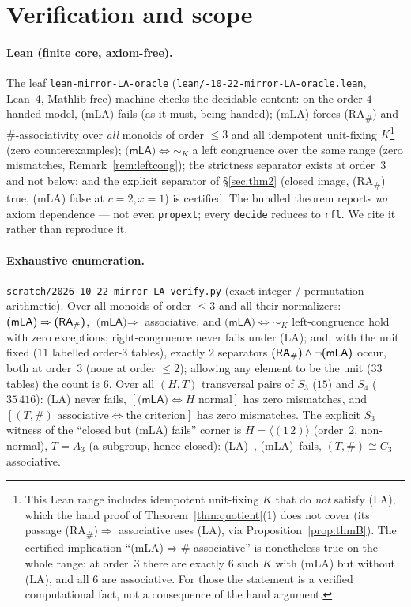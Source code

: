 \documentclass[11pt]{amsart}
\theoremstyle{plain}
\theoremstyle{definition}
\theoremstyle{remark}
\newcommand{\sh}{\mathbin{\#}}
\newcommand{\LA}{\textsf{(LA)}}
\newcommand{\mLA}{\textsf{(mLA)}}
\newcommand{\RA}{\textsf{(RA}\textsubscript{\#}\textsf{)}}
\newcommand{\simK}{\mathrel{\sim_{K}}}
\begin{document}
\section{Verification and scope}
\label{sec:verify}

\paragraph{Lean (finite core, axiom-free).} The leaf \texttt{lean-mirror-LA-oracle}
(\texttt{lean/-10-22-\allowbreak mirror-LA-\allowbreak oracle.lean}, Lean~4,
Mathlib-free) machine-checks the decidable
content: on the order-$4$ handed model, \mLA{} fails (as it must, being handed); \mLA{} forces \RA{}
and $\sh$-associativity over \emph{all} monoids of order $\le3$ and all idempotent unit-fixing
$K$\footnote{This Lean range includes idempotent unit-fixing $K$ that do \emph{not} satisfy \LA{},
which the hand proof of Theorem~\ref{thm:quotient}(1) does not cover (its passage \RA{}$\Rightarrow$
associative uses \LA{}, via Proposition~\ref{prop:thmB}). The certified implication
``\mLA{}$\Rightarrow\sh$-associative'' is nonetheless true on the whole range: at order~$3$ there are
exactly $6$ such $K$ with \mLA{} but without \LA{}, and all $6$ are associative. For those the
statement is a verified computational fact, not a consequence of the hand argument.}
(zero counterexamples); $\mLA{}\Leftrightarrow\simK$ a left congruence over the same range (zero
mismatches, Remark~\ref{rem:leftcong}); the strictness separator exists at order~$3$ and not below;
and the explicit separator of §\ref{sec:thm2} (closed image, \RA{} true, \mLA{} false at $c=2,x=1$)
is certified. The bundled theorem reports \emph{no} axiom dependence --- not even \texttt{propext};
every \texttt{decide} reduces to \texttt{rfl}. We cite it rather than reproduce it.

\paragraph{Exhaustive enumeration.} \texttt{scratch/2026-10-22-mirror-LA-verify.py} (exact integer /
permutation arithmetic). Over all monoids of order $\le3$ and all their normalizers:
$\mLA{}\Rightarrow\RA{}$, $\mLA{}\Rightarrow$ associative, and $\mLA{}\Leftrightarrow\simK$
left-congruence hold with zero exceptions; right-congruence never fails under \LA{}; and, with the
unit fixed ($11$ labelled order-$3$ tables), exactly $2$ separators $\RA{}\wedge\neg\mLA{}$ occur,
both at order~$3$ (none at order $\le2$); allowing any element to be the unit ($33$ tables) the count
is $6$. Over all $(H,T)$
transversal pairs of $S_3$ ($15$) and $S_4$ ($35\,416$): \LA{} never fails,
$[\mLA{}\Leftrightarrow H\text{ normal}]$ has zero mismatches, and
$[(T,\sh)\text{ associative}\Leftrightarrow\text{the criterion}]$ has zero mismatches. The explicit
$S_3$ witness of the ``closed but \mLA{} fails'' corner is $H=\langle(1\,2)\rangle$ (order~$2$,
non-normal), $T=A_3$ (a subgroup, hence closed): \LA{}~\checkmark, \mLA{}~fails, $(T,\sh)\cong C_3$
associative.
\end{document}

